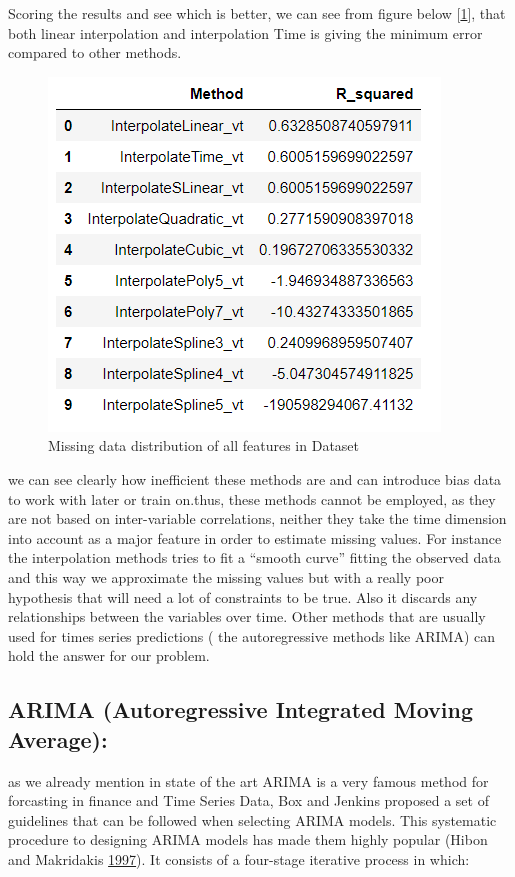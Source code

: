 Scoring the results and see which is better, we can see from figure below [\ref{fig:score}], that both linear interpolation and interpolation Time is giving the minimum error compared to other methods.

\begin{figure}
\centering
\includegraphics[width=.4\textwidth]{img/results_R.png} 
\caption{Missing data distribution of all features in Dataset}
\label{fig:score}
\end{figure}
we can see clearly how inefficient these methods are and can introduce bias data to work with later or train on.thus, these methods cannot be employed, as they are not  based on inter-variable correlations, neither they take the time dimension into account as a major feature in order to estimate missing values. For instance the interpolation methods tries to fit a “smooth curve” fitting the observed data and this way we approximate the missing values but with a really poor hypothesis that will need a lot of constraints to be true. Also it discards any relationships between the variables over time. Other methods that are usually used for times series predictions ( the autoregressive methods like ARIMA) can hold the answer for our problem.


\subsection{ ARIMA (Autoregressive Integrated Moving Average):}
as we already mention in state of the art ARIMA is a very famous method for forcasting in finance and Time Series Data,  
Box and Jenkins proposed a set of guidelines that can be followed when
selecting ARIMA models. This systematic procedure to designing ARIMA
models has made them highly popular (Hibon and Makridakis
\protect\hyperlink{ref-spyros1997}{1997}).  It consists of a four-stage iterative process in which:

